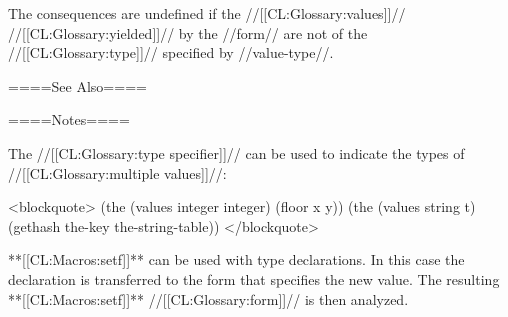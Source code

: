 The consequences are undefined if the //[[CL:Glossary:values]]// //[[CL:Glossary:yielded]]// by the //form// are not of the //[[CL:Glossary:type]]// specified by //value-type//.

====See Also====


====Notes====

The  //[[CL:Glossary:type specifier]]// can be used to indicate the types of //[[CL:Glossary:multiple values]]//:

<blockquote> (the (values integer integer) (floor x y)) (the (values string t) (gethash the-key the-string-table)) </blockquote>

**[[CL:Macros:setf]]** can be used with  type declarations. In this case the declaration is transferred to the form that specifies the new value. The resulting **[[CL:Macros:setf]]** //[[CL:Glossary:form]]// is then analyzed.

    
